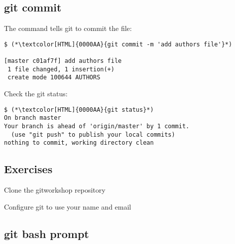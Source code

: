 \subsection{git commit}
\begin{frame}[fragile]
  \subslidetitle

  The command  tells git to commit the file:
  \begin{lstlisting}
$ (*\textcolor[HTML]{0000AA}{git commit -m 'add authors file'}*)

[master c01af7f] add authors file
 1 file changed, 1 insertion(+)
 create mode 100644 AUTHORS
\end{lstlisting}

  Check the git status:
  \begin{lstlisting}
$ (*\textcolor[HTML]{0000AA}{git status}*)
On branch master
Your branch is ahead of 'origin/master' by 1 commit.
  (use "git push" to publish your local commits)
nothing to commit, working directory clean
  \end{lstlisting}

\end{frame}


\subsection{Exercises}
\begin{frame}[fragile]
  \subslidetitle
  \begin{exercise}
  \item Clone the gitworkshop repository
  \item Configure git to use your name and email
  \end{exercise}
\end{frame}

\subsection{git bash prompt}
\begin{frame}[fragile]
  \subslidetitle
\end{frame}
